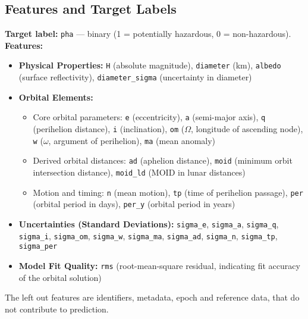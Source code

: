 \documentclass[12pt]{article}
\begin{document}
\medskip

\subsection*{Features and Target Labels}
\medskip
\textbf{Target label:} \texttt{pha} — binary (1 = potentially hazardous, 0 = non-hazardous). \\
\textbf{Features:} 
\begin{itemize}
    \item \textbf{Physical Properties:} \texttt{H} (absolute magnitude), \texttt{diameter} (km), \texttt{albedo} (surface reflectivity), \texttt{diameter\_sigma} (uncertainty in diameter)

    \item \textbf{Orbital Elements:}
    \begin{itemize}
        \item Core orbital parameters: \texttt{e} (eccentricity), \texttt{a} (semi-major axis), \texttt{q} (perihelion distance), \texttt{i} (inclination), \texttt{om} ($\Omega$, longitude of ascending node), \texttt{w} ($\omega$, argument of perihelion), \texttt{ma} (mean anomaly)
        \item Derived orbital distances: \texttt{ad} (aphelion distance), \texttt{moid} (minimum orbit intersection distance), \texttt{moid\_ld} (MOID in lunar distances)
        \item Motion and timing: \texttt{n} (mean motion), \texttt{tp} (time of perihelion passage), \texttt{per} (orbital period in days), \texttt{per\_y} (orbital period in years)
    \end{itemize}

    \item \textbf{Uncertainties (Standard Deviations):} \texttt{sigma\_e}, \texttt{sigma\_a}, \texttt{sigma\_q}, \texttt{sigma\_i}, \texttt{sigma\_om}, \texttt{sigma\_w}, \texttt{sigma\_ma}, \texttt{sigma\_ad}, \texttt{sigma\_n}, \texttt{sigma\_tp}, \texttt{sigma\_per}

    \item \textbf{Model Fit Quality:} \texttt{rms} (root-mean-square residual, indicating fit accuracy of the orbital solution)

\end{itemize}

The left out features are identifiers, metadata, epoch and reference data, that do not contribute to prediction.
\medskip
\end{document}
